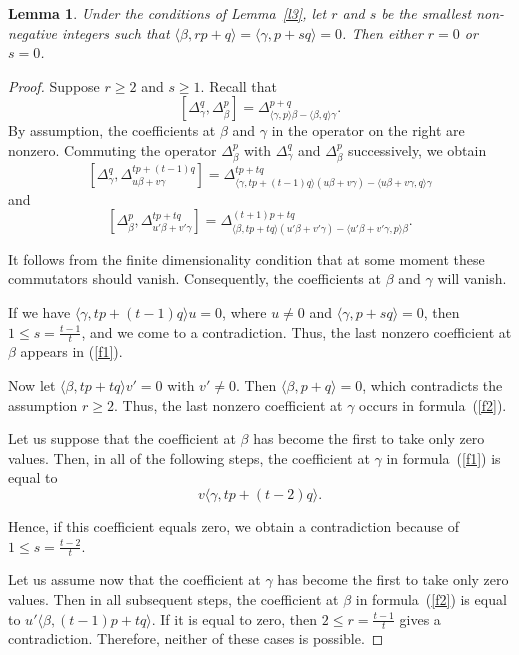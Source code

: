 \documentclass[a4paper, 12pt,oneside,reqno]{amsart}
\numberwithin{equation}{section}
\newtheorem{lemma}[theorem]{Lemma}
\theoremstyle{definition}
\begin{document}
\begin{lemma} \label{l4}
Under the conditions of Lemma~\ref{l3}, let $r$ and $s$ be the smallest non-negative integers such that $\langle\beta,rp+q\rangle=\langle\gamma,p+sq\rangle=0$. Then either $r=0$ or $s=0$. 
\end{lemma}

\begin{proof}
Suppose $r\ge 2$ and $s\ge 1$. Recall that 
$$
[\Delta^q_{\gamma}, \Delta^p_{\beta}]=\Delta^{p+q}_{\langle\gamma,p\rangle\beta-\langle\beta,q\rangle\gamma}.
$$
By assumption, the coefficients at $\beta$ and $\gamma$ in the operator on the right are nonzero. Commuting the operator $\Delta^p_{\beta}$ with $\Delta^q_{\gamma}$ and $\Delta^p_{\beta}$ successively, we obtain
\begin{equation} \label{f1}
[\Delta^q_{\gamma}, \Delta^{tp+(t-1)q}_{u\beta+v\gamma}]=\Delta^{tp+tq}_{\langle\gamma, tp+(t-1)q\rangle(u\beta+v\gamma)-\langle u\beta+v\gamma,q\rangle\gamma}
\end{equation}
and
\begin{equation} \label{f2}
[\Delta^p_{\beta}, \Delta^{tp+tq}_{u'\beta+v'\gamma}]=\Delta^{(t+1)p+tq}_{\langle\beta, tp+tq\rangle(u'\beta+v'\gamma)-\langle u'\beta+v'\gamma,p\rangle\beta}. 
\end{equation}

It follows from the finite dimensionality condition that at some moment these commutators should vanish. Consequently, the coefficients at $\beta$ and $\gamma$ will vanish. 

If we have $\langle\gamma, tp+(t-1)q\rangle u=0$, where $u\ne 0$ and $\langle\gamma,p+sq\rangle=0$, then $1\le s=\frac{t-1}{t}$, and we come to a contradiction. Thus, the last nonzero coefficient at $\beta$ appears in (\ref{f1}).

Now let $\langle\beta,tp+tq\rangle v'=0$ with $v'\ne 0$. Then $\langle\beta,p+q\rangle=0$, which contradicts the assumption $r\ge 2$. Thus, the last nonzero coefficient at $\gamma$ occurs in formula~(\ref{f2}). 

Let us suppose that the coefficient at $\beta$ has become the first to take only zero values. Then, in all of the following steps, the coefficient at $\gamma$ in formula~(\ref{f1}) is equal to
$$
v\langle\gamma,tp+(t-2)q\rangle.
$$ 

Hence, if this coefficient equals zero, we obtain a contradiction because of~${1\le s=\frac{t-2}{t}}$. 

Let us assume now that the coefficient at $\gamma$ has become the first to take only zero values. Then in all subsequent steps, the coefficient at $\beta$ in formula~(\ref{f2}) is equal to
$u'\langle\beta,(t-1)p+tq\rangle.$ If it is equal to zero, then $2\le r=\frac{t-1}{t}$ gives a contradiction. Therefore, neither of these cases is possible.


\end{proof}
\end{document}
